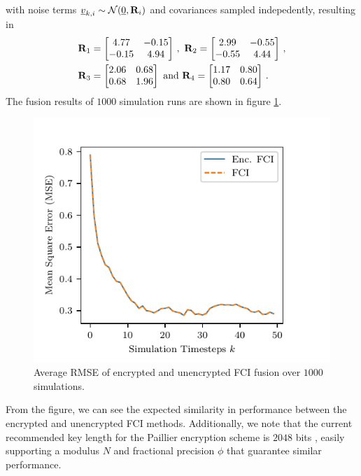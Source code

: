 \documentclass[letterpaper, 10 pt, conference]{ieeeconf}
\begin{document}
with noise terms ${\underline{v}}_{k,i} \sim \mathcal{N}({\underline{0}}, {{\mathbf{R}}}_i)$ and covariances sampled indepedently, resulting in
\begin{equation}
    \begin{split}
        &\mat{R}_1 = 
        \begin{bmatrix}
            4.77 & -0.15\\
            -0.15 & 4.94
        \end{bmatrix}\,,\ 
        \mat{R}_2 = 
        \begin{bmatrix}
            2.99 & -0.55\\
            -0.55 & 4.44
        \end{bmatrix}\,,\\
        &\mat{R}_3 = 
        \begin{bmatrix}
            2.06 & 0.68\\
            0.68 & 1.96
        \end{bmatrix}\text{ and }
        \mat{R}_4 = 
        \begin{bmatrix}
            1.17 & 0.80\\
            0.80 & 0.64
        \end{bmatrix}\,.
    \end{split}
\end{equation}
The fusion results of $1000$ simulation runs are shown in figure \ref{fig:sim_error_plot}. 
\begin{figure}[htbp]
    \centering
    \vspace{-\baselineskip}
    \includegraphics{figures/sim_error_plot.pdf}
    \caption{Average RMSE of encrypted and unencrypted FCI fusion over $1000$ simulations.}
    \label{fig:sim_error_plot}
\end{figure}
From the figure, we can see the expected similarity in performance between the encrypted and unencrypted FCI methods. Additionally, we note that the current recommended key length for the Paillier encryption scheme is $2048$ bits \cite{barkerRecommendationPairWiseKey2019}, easily supporting a modulus $N$ and fractional precision $\phi$ that guarantee similar performance.
\end{document}
